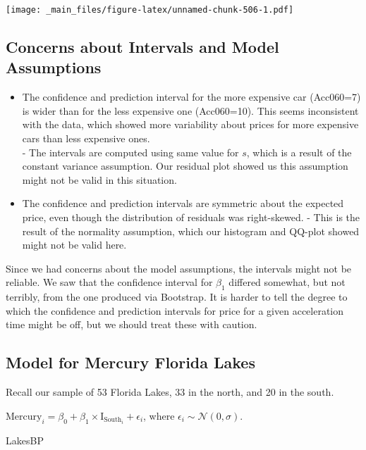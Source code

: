 \documentclass[]{book}
\newenvironment{Shaded}{\begin{snugshade}}{\end{snugshade}}
\newcommand{\NormalTok}[1]{#1}
\begin{document}
\texttt{[image: \_main\_files/figure-latex/unnamed-chunk-506-1.pdf]}

\subsection{Concerns about Intervals and Model
Assumptions}\label{concerns-about-intervals-and-model-assumptions}

\begin{itemize}
\item
  The confidence and prediction interval for the more expensive car
  (Acc060=7) is wider than for the less expensive one (Acc060=10). This
  seems inconsistent with the data, which showed more variability about
  prices for more expensive cars than less expensive ones.\\
  - The intervals are computed using same value for \(s\), which is a
  result of the constant variance assumption. Our residual plot showed
  us this assumption might not be valid in this situation.
\item
  The confidence and prediction intervals are symmetric about the
  expected price, even though the distribution of residuals was
  right-skewed. - This is the result of the normality assumption, which
  our histogram and QQ-plot showed might not be valid here.
\end{itemize}

Since we had concerns about the model assumptions, the intervals might
not be reliable. We saw that the confidence interval for \(\beta_1\)
differed somewhat, but not terribly, from the one produced via
Bootstrap. It is harder to tell the degree to which the confidence and
prediction intervals for price for a given acceleration time might be
off, but we should treat these with caution.

\subsection{Model for Mercury Florida
Lakes}\label{model-for-mercury-florida-lakes}

Recall our sample of 53 Florida Lakes, 33 in the north, and 20 in the
south.

\(\text{Mercury}_i = \beta_0 + \beta_1\times\text{I}_{\text{South}_i} + \epsilon_i\),
where \(\epsilon_i\sim\mathcal{N}(0, \sigma)\).

\begin{Shaded}
\begin{Highlighting}[]
\NormalTok{LakesBP}
\end{Highlighting}
\end{Shaded}
\end{document}
